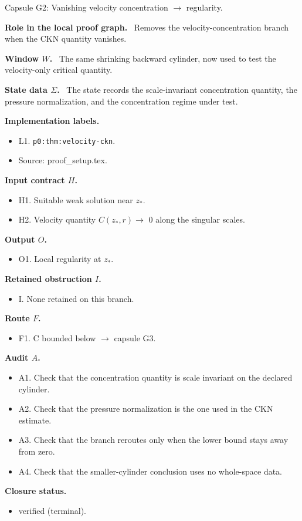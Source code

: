 \documentclass[11pt]{amsart}
\newcommand{\capsulefield}[1]{\par\smallskip\noindent\textbf{#1.}\ }
\begin{document}
\begin{proofcapsule}{Capsule G2: Vanishing velocity concentration $\to$ regularity.}
  \capsulefield{Role in the local proof graph}
  Removes the velocity-concentration branch when the CKN quantity vanishes.

  \capsulefield{Window \(W\)}
The same shrinking backward cylinder, now used to test the velocity-only critical quantity.

  \capsulefield{State data \(\Sigma\)}
The state records the scale-invariant concentration quantity, the pressure normalization, and the concentration regime under test.

  \capsulefield{Implementation labels}
  \begin{itemize}[leftmargin=1.8em]
  \item L1. \texttt{p0:thm:velocity-ckn}.
  \item Source: proof\_setup.tex.
  \end{itemize}

  \capsulefield{Input contract \(H\)}
  \begin{itemize}[leftmargin=1.8em]
  \item H1. Suitable weak solution near $z_*$.
  \item H2. Velocity quantity $C(z_*,r) \to$ 0 along the singular scales.
  \end{itemize}

  \capsulefield{Output \(O\)}
  \begin{itemize}[leftmargin=1.8em]
  \item O1. Local regularity at $z_*$.
  \end{itemize}

  \capsulefield{Retained obstruction \(I\)}
  \begin{itemize}[leftmargin=1.8em]
  \item I. None retained on this branch.
  \end{itemize}

  \capsulefield{Route \(F\)}
  \begin{itemize}[leftmargin=1.8em]
  \item F1. C bounded below $\to$ capsule G3.
  \end{itemize}

  \capsulefield{Audit \(A\)}
  \begin{itemize}[leftmargin=1.8em]
  \item A1. Check that the concentration quantity is scale invariant on the declared cylinder.
  \item A2. Check that the pressure normalization is the one used in the CKN estimate.
  \item A3. Check that the branch reroutes only when the lower bound stays away from zero.
  \item A4. Check that the smaller-cylinder conclusion uses no whole-space data.
  \end{itemize}
  \capsulefield{Closure status}
  \begin{itemize}[leftmargin=1.8em]
  \item verified (terminal).
  \end{itemize}
\end{proofcapsule}
\end{document}
